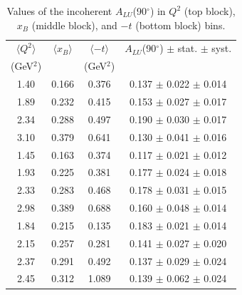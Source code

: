 \documentclass[aps,prc,preprint,superscriptaddress]{revtex4}
\begin{document}
\begin{table}[!h]
\begin{center}
\begin{tabular}{|c|c|c|c|}
\hline
 $\langle Q^{2} \rangle$ & $\langle x_{B} \rangle$ & $\langle -t \rangle$  & $A_{LU}$(90$^{\circ}$) $\pm$ stat. $\pm$ syst.\\
 (GeV$^{2}$) &           & (GeV$^{2}$) &  \\
 \hline 
  1.40  & 0.166 & 0.376 & 0.137  $\pm$ 0.022  $\pm$ 0.014 \\   
  1.89  & 0.232 & 0.415 & 0.153  $\pm$ 0.027  $\pm$ 0.017 \\   
  2.34  & 0.288 & 0.497 & 0.190  $\pm$ 0.030  $\pm$ 0.017 \\   
  3.10  & 0.379 & 0.641 & 0.130  $\pm$ 0.041  $\pm$ 0.016 \\   
 \hline 
  1.45  & 0.163 & 0.374 & 0.117  $\pm$ 0.021  $\pm$ 0.012 \\   
  1.93  & 0.225 & 0.381 & 0.177  $\pm$ 0.024  $\pm$ 0.018 \\   
  2.33  & 0.283 & 0.468 & 0.178  $\pm$ 0.031  $\pm$ 0.015 \\   
  2.98  & 0.389 & 0.688 & 0.160  $\pm$ 0.048  $\pm$ 0.014 \\   
 \hline 
  1.84  & 0.215 & 0.135 & 0.183  $\pm$ 0.021  $\pm$ 0.014 \\   
  2.15  & 0.257 & 0.281 & 0.141  $\pm$ 0.027  $\pm$ 0.020 \\   
  2.37  & 0.291 & 0.492 & 0.137  $\pm$ 0.029  $\pm$ 0.024 \\   
  2.45  & 0.312 & 1.089 & 0.139  $\pm$ 0.062  $\pm$ 0.024 \\   
 \hline
 \end{tabular}
 \caption{Values of the incoherent $A_{LU}$(90$^{\circ}$) in $Q^2$ (top block), $x_B$ (middle block), and $-t$ (bottom block) bins.}
 \label{table:InCoh_BSA_90}
 \end{center}
\end{table}
\end{document}

